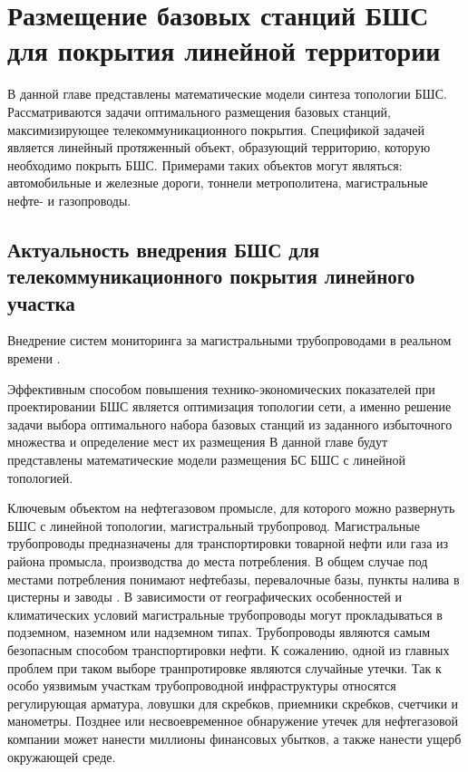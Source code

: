 \chapter{Размещение базовых станций БШС для покрытия линейной территории}\label{chapter_linear_network}

В данной главе представлены математические модели синтеза топологии БШС. Рассматриваются задачи оптимального размещения базовых станций, максимизирующее телекоммуникационного покрытия. Спецификой задачей является линейный протяженный объект, образующий территорию, которую необходимо покрыть БШС. Примерами таких объектов могут являться: автомобильные и железные дороги, тоннели метрополитена, магистральные нефте- и газопроводы. 

\section{Актуальность внедрения БШС для телекоммуникационного покрытия линейного участка}


Внедрение систем мониторинга за магистральными трубопроводами в реальном времени \cite{Fawzi2019}.

\fixme{====================================================}

Эффективным способом повышения технико-экономических показателей при проектировании БШС является оптимизация топологии сети, а именно решение задачи выбора оптимального набора базовых станций из заданного избыточного множества и определение мест их размещения В данной главе будут представлены математические модели размещения БС БШС с линейной топологией.
 
Ключевым объектом на нефтегазовом промысле, для которого можно развернуть БШС с линейной топологии, магистральный трубопровод. Магистральные трубопроводы предназначены для транспортировки товарной нефти или газа из района промысла, производства до места потребления. В общем случае под местами потребления понимают нефтебазы, перевалочные базы, пункты налива в цистерны и заводы \cite{Deineko2018}. В зависимости от географических особенностей и климатических условий магистральные трубопроводы могут прокладываться в подземном, наземном или надземном типах. Трубопроводы являются самым безопасным способом транспортировки нефти. К сожалению, одной из главных проблем при таком выборе транпротировке являются случайные утечки. Так к особо уязвимым участкам трубопроводной инфраструктуры относятся регулирующая арматура, ловушки для скребков, приемники скребков, счетчики и манометры. Позднее или несвоевременное обнаружение утечек для нефтегазовой компании  может нанести миллионы финансовых убытков, а также нанести ущерб окружающей среде.

